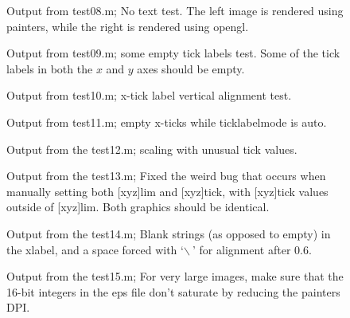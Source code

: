 \documentclass[a4paper,11pt]{article}
\begin{document}
     \begin{figure}[ht]
       \centering
       \quad
       \caption{Output from {\ttfamily test08.m}; No text test. The left image is rendered using
       painters, while the right is rendered using opengl.}
     \end{figure}
     \begin{figure}
       \centering
       \caption{Output from {\ttfamily test09.m}; some empty tick labels test. Some of the tick labels
       in both the $x$ and $y$ axes should be empty.}
     \end{figure}
     \begin{figure}
       \centering
       \caption{Output from {\ttfamily test10.m}; x-tick label vertical alignment test.}
     \end{figure}
     \begin{figure}
       \centering
       \caption{Output from {\ttfamily test11.m}; empty x-ticks while {\ttfamily ticklabelmode}
       is {\ttfamily auto}.}
     \end{figure}
     \begin{figure}[ht]
       \centering
       \caption{Output from the {\ttfamily test12.m}; scaling with unusual tick values.}
     \end{figure}
     \begin{figure}[ht]
       \centering
       \quad
       \caption{Output from the {\ttfamily test13.m}; Fixed the weird bug that occurs when
         manually setting both [xyz]lim and [xyz]tick, with [xyz]tick values outside of [xyz]lim.
         Both graphics should be identical.}
     \end{figure}
     \begin{figure}[ht]
       \centering
       \caption{Output from the {\ttfamily test14.m}; Blank strings (as opposed to empty) in the
         xlabel, and a space forced with {\ttfamily `$\backslash~$'} for alignment after $0.6$.}
     \end{figure}
     \begin{figure}
       \centering
       \caption{Output from the {\ttfamily test15.m}; For very large images, make sure that the
         16-bit integers in the eps file don't saturate by reducing the painters DPI.}
     \end{figure}
\end{document}
